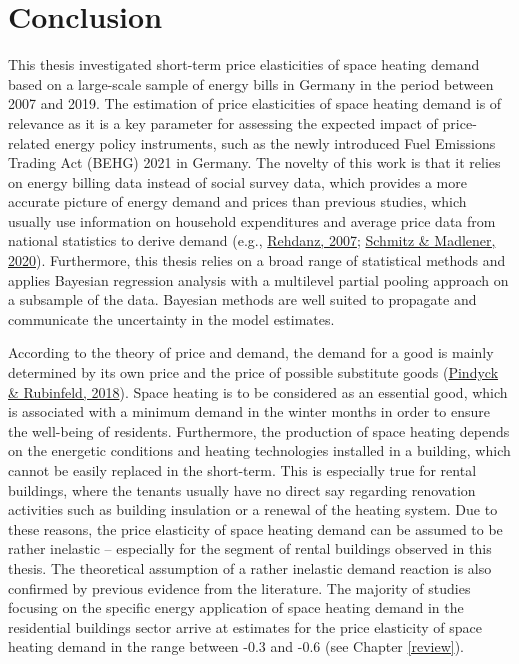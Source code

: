 \documentclass[12pt,twoside]{reedthesis}
\begin{document}
\hypertarget{conclusion}{%
\chapter{Conclusion}\label{conclusion}}

This thesis investigated short-term price elasticities of space heating demand based on a large-scale sample of energy bills in Germany in the period between 2007 and 2019. The estimation of price elasticities of space heating demand is of relevance as it is a key parameter for assessing the expected impact of price-related energy policy instruments, such as the newly introduced Fuel Emissions Trading Act (BEHG) 2021 in Germany. The novelty of this work is that it relies on energy billing data instead of social survey data, which provides a more accurate picture of energy demand and prices than previous studies, which usually use information on household expenditures and average price data from national statistics to derive demand (e.g., \protect\hyperlink{ref-rehdanz07}{Rehdanz, 2007}; \protect\hyperlink{ref-schmitz_madlener20}{Schmitz \& Madlener, 2020}). Furthermore, this thesis relies on a broad range of statistical methods and applies Bayesian regression analysis with a multilevel partial pooling approach on a subsample of the data. Bayesian methods are well suited to propagate and communicate the uncertainty in the model estimates.

According to the theory of price and demand, the demand for a good is mainly determined by its own price and the price of possible substitute goods (\protect\hyperlink{ref-pindyck_rubinfeld18}{Pindyck \& Rubinfeld, 2018}). Space heating is to be considered as an essential good, which is associated with a minimum demand in the winter months in order to ensure the well-being of residents. Furthermore, the production of space heating depends on the energetic conditions and heating technologies installed in a building, which cannot be easily replaced in the short-term. This is especially true for rental buildings, where the tenants usually have no direct say regarding renovation activities such as building insulation or a renewal of the heating system. Due to these reasons, the price elasticity of space heating demand can be assumed to be rather inelastic -- especially for the segment of rental buildings observed in this thesis. The theoretical assumption of a rather inelastic demand reaction is also confirmed by previous evidence from the literature. The majority of studies focusing on the specific energy application of space heating demand in the residential buildings sector arrive at estimates for the price elasticity of space heating demand in the range between -0.3 and -0.6 (see Chapter \ref{review}).
\end{document}
